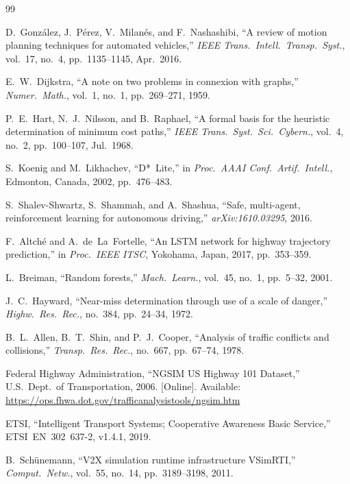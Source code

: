 \documentclass[conference]{IEEEtran}
\begin{document}
\balance
\begin{thebibliography}{99}

D.~Gonz\'{a}lez, J.~P\'{e}rez, V.~Milan\'{e}s, and F.~Nashashibi,
``A review of motion planning techniques for automated vehicles,''
\textit{IEEE Trans.\ Intell.\ Transp.\ Syst.}, vol.~17, no.~4,
pp.~1135--1145, Apr.\ 2016.

E.~W.~Dijkstra,
``A note on two problems in connexion with graphs,''
\textit{Numer.\ Math.}, vol.~1, no.~1, pp.~269--271, 1959.

P.~E.~Hart, N.~J.~Nilsson, and B.~Raphael,
``A formal basis for the heuristic determination of minimum cost paths,''
\textit{IEEE Trans.\ Syst.\ Sci.\ Cybern.}, vol.~4, no.~2, pp.~100--107,
Jul.\ 1968.

S.~Koenig and M.~Likhachev,
``D*~Lite,''
in \textit{Proc.\ AAAI Conf.\ Artif.\ Intell.}, Edmonton, Canada, 2002,
pp.~476--483.

S.~Shalev-Shwartz, S.~Shammah, and A.~Shashua,
``Safe, multi-agent, reinforcement learning for autonomous driving,''
\textit{arXiv:1610.03295}, 2016.

F.~Altch\'{e} and A.~de~La~Fortelle,
``An LSTM network for highway trajectory prediction,''
in \textit{Proc.\ IEEE ITSC}, Yokohama, Japan, 2017, pp.~353--359.

L.~Breiman,
``Random forests,''
\textit{Mach.\ Learn.}, vol.~45, no.~1, pp.~5--32, 2001.

J.~C.~Hayward,
``Near-miss determination through use of a scale of danger,''
\textit{Highw.\ Res.\ Rec.}, no.~384, pp.~24--34, 1972.

B.~L.~Allen, B.~T.~Shin, and P.~J.~Cooper,
``Analysis of traffic conflicts and collisions,''
\textit{Transp.\ Res.\ Rec.}, no.~667, pp.~67--74, 1978.

Federal Highway Administration,
``NGSIM US Highway 101 Dataset,''
U.S.\ Dept.\ of Transportation, 2006.
[Online]. Available:
\url{https://ops.fhwa.dot.gov/trafficanalysistools/ngsim.htm}

ETSI,
``Intelligent Transport Systems; Cooperative Awareness Basic Service,''
ETSI~EN~302~637-2, v1.4.1, 2019.

B.~Sch\"{u}nemann,
``V2X simulation runtime infrastructure VSimRTI,''
\textit{Comput.\ Netw.}, vol.~55, no.~14, pp.~3189--3198, 2011.


\end{thebibliography}
\end{document}

